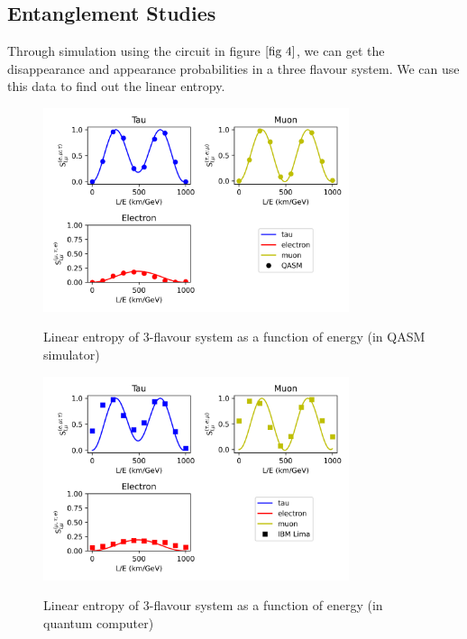\documentclass[12pt,a4paper]{report}
\begin{document}
\subsection{Entanglement Studies}
Through simulation using the circuit in figure $\ref{fig 4}$, we can get the disappearance and appearance probabilities in a three flavour system. We can use this data to find out the linear entropy.
\begin{figure}[H]
	\graphicspath{ {./Images/} }
	\centering	
	{\includegraphics[width=0.8\textwidth]{fig_9a.png}}
	\caption{Linear entropy of 3-flavour system as a function of energy (in QASM simulator)}
	\label{fig 9a}
\end{figure}
\begin{figure}[H]
	\graphicspath{ {./Images/} }
	\centering	
	{\includegraphics[width=0.8\textwidth]{fig_9b.png}}
	\caption{Linear entropy of 3-flavour system as a function of energy (in quantum computer)}
	\label{fig 9b}
\end{figure}
\end{document}

